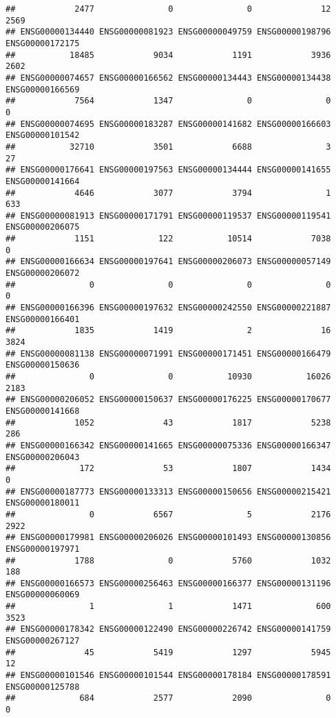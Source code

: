 \documentclass[
]{article}
\begin{document}
\begin{verbatim}
##            2477               0               0              12            2569 
## ENSG00000134440 ENSG00000081923 ENSG00000049759 ENSG00000198796 ENSG00000172175 
##           18485            9034            1191            3936            2602 
## ENSG00000074657 ENSG00000166562 ENSG00000134443 ENSG00000134438 ENSG00000166569 
##            7564            1347               0               0               0 
## ENSG00000074695 ENSG00000183287 ENSG00000141682 ENSG00000166603 ENSG00000101542 
##           32710            3501            6688               3              27 
## ENSG00000176641 ENSG00000197563 ENSG00000134444 ENSG00000141655 ENSG00000141664 
##            4646            3077            3794               1             633 
## ENSG00000081913 ENSG00000171791 ENSG00000119537 ENSG00000119541 ENSG00000206075 
##            1151             122           10514            7038               0 
## ENSG00000166634 ENSG00000197641 ENSG00000206073 ENSG00000057149 ENSG00000206072 
##               0               0               0               0               0 
## ENSG00000166396 ENSG00000197632 ENSG00000242550 ENSG00000221887 ENSG00000166401 
##            1835            1419               2              16            3824 
## ENSG00000081138 ENSG00000071991 ENSG00000171451 ENSG00000166479 ENSG00000150636 
##               0               0           10930           16026            2183 
## ENSG00000206052 ENSG00000150637 ENSG00000176225 ENSG00000170677 ENSG00000141668 
##            1052              43            1817            5238             286 
## ENSG00000166342 ENSG00000141665 ENSG00000075336 ENSG00000166347 ENSG00000206043 
##             172              53            1807            1434               0 
## ENSG00000187773 ENSG00000133313 ENSG00000150656 ENSG00000215421 ENSG00000180011 
##               0            6567               5            2176            2922 
## ENSG00000179981 ENSG00000206026 ENSG00000101493 ENSG00000130856 ENSG00000197971 
##            1788               0            5760            1032             188 
## ENSG00000166573 ENSG00000256463 ENSG00000166377 ENSG00000131196 ENSG00000060069 
##               1               1            1471             600            3523 
## ENSG00000178342 ENSG00000122490 ENSG00000226742 ENSG00000141759 ENSG00000267127 
##              45            5419            1297            5945              12 
## ENSG00000101546 ENSG00000101544 ENSG00000178184 ENSG00000178591 ENSG00000125788 
##             684            2577            2090               0               0 

\end{verbatim}
\end{document}
